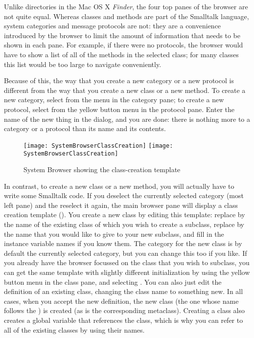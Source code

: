 \documentclass[a4paper,10pt,twoside]{book}
\begin{document}
Unlike directories in the Mac OS X \emph{Finder}, the four top panes of the browser are not quite equal.  
Whereas classes and methods are part of the Smalltalk language, system categories and message protocols are not: they are a convenience introduced by the browser to limit the amount of information that needs to be shown in each pane.  For example, if there were no protocols, the browser would have to show a list of all of the methods in the selected class; for many classes this list would be too large to navigate conveniently.  

Because of this, the way that you create a new category or a new protocol is different from the way that you create a new class or a new method.  To create a new category, select  from the  menu in the category pane; to create a new protocol, select  from the yellow button menu in the protocol pane. 
Enter the name of the new thing in the dialog, and you are done: there is nothing more to a category or a protocol than its name and its contents.

\begin{figure}[htbp]
   \centering
   \ifluluelse
	   {\texttt{[image: SystemBrowserClassCreation]}}
	   {\texttt{[image: SystemBrowserClassCreation]}}
   \caption{System Browser showing the class-creation template
   \label{fig:SystemBrowserClassCreation}}
\end{figure}

In contrast, to create a new class or a new method, you will actually
have to write some Smalltalk code.  If you deselect the currently
selected category (most left pane) and the reselect it again, the main
browser pane will display a class creation template
().  You create a new class by
editing this template: replace  by the name of the existing
class of which you wish to create a subclass, replace
 by the name that you would like to give to your
new subclass, and fill in the instance variable names if you know
them.  The category for the new class is by default the currently
selected category, but you can change this too if you like.  If you
already have the browser focussed on the class that you wish to
subclass, you can get the same template with slightly different
initialization by using the yellow button menu in the class pane, and
selecting .  You can also just
edit the definition of an existing class, changing the class name to
something new.  In all cases, when you accept the new definition, the
new class (the one whose name follows the \ct{#}) is created (as is
the corresponding metaclass).  Creating a class also creates a global
variable that references the class, which is why you can refer to all
of the existing classes by using their names.  
\end{document}
